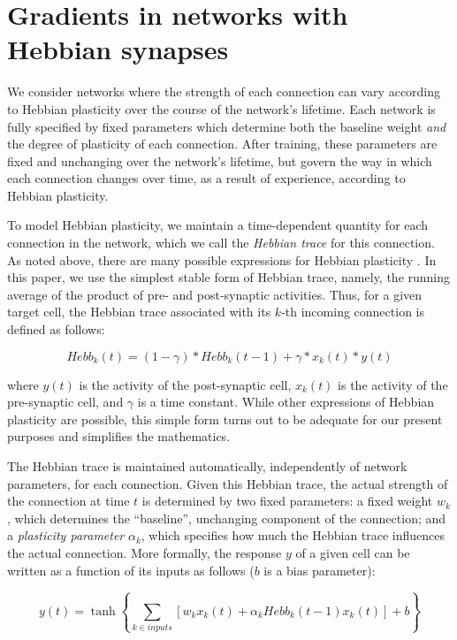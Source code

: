 \documentclass{article}
\begin{document}
\section{Gradients in networks with Hebbian synapses}

We consider networks where the strength of each connection can vary according to
Hebbian plasticity over the course of the network's lifetime. Each network is
fully specified
by fixed parameters which determine both the baseline weight \emph{and} the degree of plasticity of each connection.
After training, these parameters are fixed and unchanging over the network's
lifetime, but govern the way in which
each connection changes over time, as a result of experience, according to Hebbian plasticity. 

To model Hebbian plasticity, we maintain a time-dependent quantity for each
connection in the network, which we call the \emph{Hebbian trace} for this
connection. As noted above, there are many possible expressions for Hebbian
plasticity \cite{Vasilkoski2011-ww}. In this paper, we use the simplest stable
form of Hebbian trace,
namely, the running average of the product of pre- and post-synaptic
activities. Thus, for a given target cell, the Hebbian trace associated with
its $k$-th incoming connection is defined as follows:

\begin{equation}
\label{eq:hebb}
Hebb_k(t) = (1-\gamma) * Hebb_k(t-1) + \gamma * x_k(t) * y(t)
\end{equation}

where $y(t)$ is the activity of the post-synaptic cell, $x_k(t)$ is the activity
of the pre-synaptic cell, and $\gamma$ is a time constant. While other
expressions of Hebbian plasticity are possible, this simple form turns out to be
adequate for our present purposes and simplifies the mathematics.

The Hebbian trace is maintained automatically, independently of network
parameters, for each connection. Given this Hebbian trace, the
actual strength of the connection at time $t$ is determined by two fixed parameters: a fixed
weight $w_k$, which determines the ``baseline'', unchanging component of the
connection; and a \emph{plasticity parameter} $\alpha_k$, which specifies how
much the Hebbian trace influences the actual connection. More formally, the
response $y$ of a given cell can be written as a function of its inputs as
follows ($b$ is a bias parameter):

\begin{equation}
\label{eq:y}
y(t) = \tanh\left\{\sum_{k \in inputs}[w_k x_k(t) + \alpha_k Hebb_k(t-1) x_k(t)] +
b\right\}
\end{equation}
\end{document}
